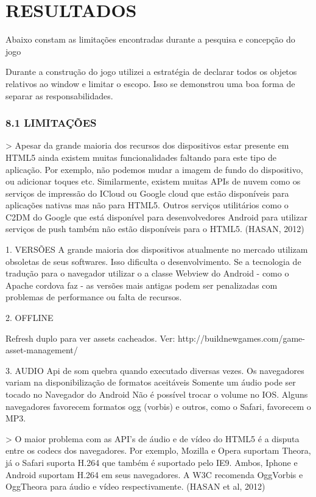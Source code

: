 \documentclass[11pt,a4paper]{article}
\begin{document}
\chapter{RESULTADOS}

Abaixo constam as limitações encontradas durante a pesquisa e concepção do jogo

Durante a construção do jogo utilizei a estratégia de declarar todos
os objetos relativos ao window e limitar o escopo. Isso se demonstrou
uma boa forma de separar as responsabilidades.

\subsection{8.1  LIMITAÇÕES}

> Apesar da grande maioria dos recursos dos dispositivos estar presente
em HTML5 ainda existem muitas funcionalidades faltando para este tipo
de aplicação. Por exemplo, não podemos mudar a imagem de fundo do
dispositivo, ou adicionar toques etc. Similarmente, existem muitas
APIs de nuvem como os serviços de impressão do ICloud ou Google
cloud que estão disponíveis para aplicações nativas mas não para
HTML5. Outros serviços utilitários como o C2DM do Google que está
disponível para desenvolvedores Android para utilizar serviços de push
também não estão disponíveis para o HTML5. (HASAN, 2012)

1.  VERSÕES
A grande maioria dos dispositivos atualmente no mercado utilizam
obsoletas de seus softwares. Isso dificulta o desenvolvimento. Se a
tecnologia de tradução para o navegador utilizar o a classe Webview do
Android - como o Apache cordova faz - as versões mais antigas podem ser
penalizadas com problemas de performance ou falta de recursos.

2. OFFLINE

Refresh duplo para ver assets cacheados. Ver:
http://buildnewgames.com/game-asset-management/

3. AUDIO
Api de som quebra quando executado diversas vezes.
Os navegadores variam na disponibilização de formatos aceitáveis
Somente um áudio pode ser tocado no Navegador do Android
Não é possível trocar o volume no IOS.
Alguns navegadores favorecem formatos ogg (vorbis) e outros, como o
Safari, favorecem o MP3.

> O maior problema com as API's de áudio e de vídeo do HTML5 é
a disputa entre os codecs dos navegadores. Por exemplo, Mozilla e
Opera suportam Theora, já o Safari suporta H.264 que também é
suportado pelo IE9. Ambos, Iphone e Android suportam H.264 em seus
navegadores. A W3C recomenda OggVorbis e OggTheora para áudio e vídeo
respectivamente. (HASAN et al, 2012)
\end{document}
